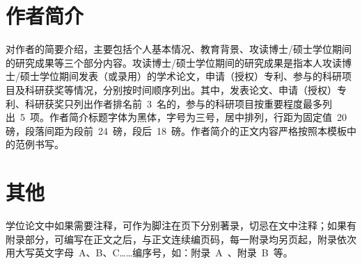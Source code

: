 \section{作者简介}

对作者的简要介绍，主要包括个人基本情况、教育背景、攻读博士/硕士学位期间的研究成果等三个部分内容。攻读博士/硕士学位期间的研究成果是指本人攻读博士/硕士学位期间发表（或录用）的学术论文，申请（授权）专利、参与的科研项目及科研获奖等情况，分别按时间顺序列出。其中，发表论文、申请（授权）专利、科研获奖只列出作者排名前~3~名的，参与的科研项目按重要程度最多列出~5~项。作者简介标题字体为黑体，字号为三号，居中排列，行距为固定值~20~ 磅，段落间距为段前~24~磅，段后~18~磅。作者简介的正文内容严格按照本模板中的范例书写。

\section{其他}

学位论文中如果需要注释，可作为脚注在页下分别著录，切忌在文中注释；如果有附录部分，可编写在正文之后，与正文连续编页码，每一附录均另页起，附录依次用大写英文字母~A、B、C……编序号，如：附录~A~、附录~B~等。
